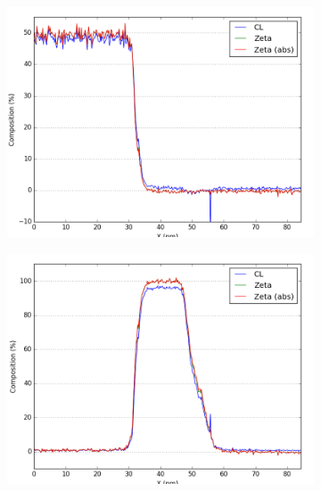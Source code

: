 \begin{figure}
\begin{subfigure}{.45\textwidth}
		\caption{}
		\label{fig:zeta_area1_ga}
	\end{subfigure}%
\hfill
	\begin{subfigure}{.45\textwidth}
		\centering
		\includegraphics[width=\linewidth]{fig/q-new/oldzetas_Sa_As_Ka}
		\caption{}
		\label{fig:zeta_area1_as}
	\end{subfigure}
\hfill
		\begin{subfigure}{.45\textwidth}
			\centering
			\includegraphics[width=\linewidth]{fig/q-new/oldzetas_Sa_Pd_La}
			\caption{}
			\label{fig:zeta_area1_pd}
		\end{subfigure}%
	\hfill
		\begin{subfigure}{.45\textwidth}
			\centering

\end{subfigure}
\end{figure}
